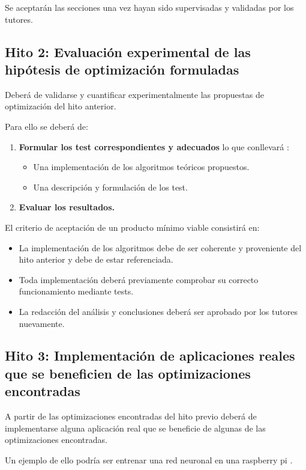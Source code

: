 Se aceptarán las secciones una vez hayan sido supervisadas y validadas por los tutores. 

\subsection*{Hito 2: Evaluación experimental de las hipótesis de optimización formuladas}

Deberá de validarse y cuantificar experimentalmente las propuestas de optimización del hito anterior. 

Para ello  se deberá de: 
\begin{enumerate}
    \item \textbf{Formular los test correspondientes y adecuados} lo que conllevará : 
    \begin{itemize}
        \item Una implementación de los algoritmos teóricos propuestos.
        \item Una descripción y formulación de los test.
    \end{itemize}

    \item \textbf{Evaluar los resultados.}
\end{enumerate}

El criterio de aceptación de un producto mínimo viable consistirá en:
\begin{itemize}
    \item La implementación de los algoritmos debe de ser coherente y proveniente del hito anterior y debe de estar referenciada.
    \item  Toda implementación deberá previamente comprobar su correcto funcionamiento mediante tests.
    \item La redacción del análisis y conclusiones deberá ser aprobado por los tutores nuevamente.
\end{itemize}

\subsection*{Hito 3: Implementación de aplicaciones reales que se beneficien de las optimizaciones encontradas }

A partir de las optimizaciones encontradas del hito previo deberá de implementarse alguna aplicación real que se beneficie de algunas de las optimizaciones encontradas. 

Un ejemplo de ello podría ser entrenar una red neuronal en una raspberry pi .



